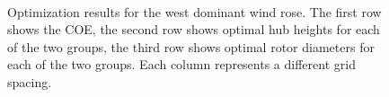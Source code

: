 \documentclass[conf]{new-aiaa}
\begin{document}
\begin{figure}[htbp]
\begin{centering}
    \hspace{-0.35cm}
    \hspace{-0.35cm}
    \hspace{-0.35cm}
    \\
    \vspace{-0.25cm}
    \caption{Optimization results for the west dominant wind rose. The first row shows the COE, the second row shows optimal hub heights for each of the two groups, the third row shows optimal rotor diameters for each of the two groups. Each column represents a different grid spacing.}
  \label{west}
  \end{centering}
\end{figure}
   
\end{document}
